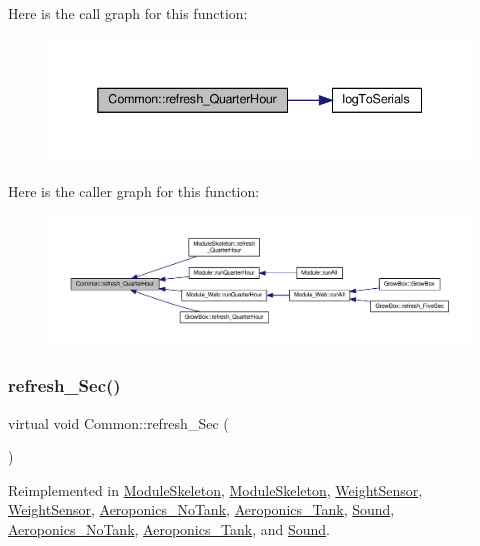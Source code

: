 Here is the call graph for this function\+:
\nopagebreak
\begin{figure}[H]
\begin{center}
\leavevmode
\includegraphics[width=338pt]{class_common_aa7222229739c89d441fadd6a40deff89_cgraph}
\end{center}
\end{figure}
Here is the caller graph for this function\+:
\nopagebreak
\begin{figure}[H]
\begin{center}
\leavevmode
\includegraphics[width=350pt]{class_common_aa7222229739c89d441fadd6a40deff89_icgraph}
\end{center}
\end{figure}
\mbox{\label{class_common_aa7add0429096fbb9059a341e677d7a32}} 
\subsubsection{\texorpdfstring{refresh\+\_\+\+Sec()}{refresh\_Sec()}\hspace{0.1cm}{\footnotesize\ttfamily [1/2]}}
{\footnotesize\ttfamily virtual void Common\+::refresh\+\_\+\+Sec (\begin{DoxyParamCaption}{ }\end{DoxyParamCaption})\hspace{0.3cm}{\ttfamily [virtual]}}



Reimplemented in \hyperlink{class_module_skeleton_ae9b2578a2c1ecb343cd7b3b21320145e}{Module\+Skeleton}, \hyperlink{class_module_skeleton_ae9b2578a2c1ecb343cd7b3b21320145e}{Module\+Skeleton}, \hyperlink{class_weight_sensor_a6f7c6cab318b6677e43b7deb9e0b5fee}{Weight\+Sensor}, \hyperlink{class_weight_sensor_a6f7c6cab318b6677e43b7deb9e0b5fee}{Weight\+Sensor}, \hyperlink{class_aeroponics___no_tank_a8e0130107832f0a60d37ea581f6f67fb}{Aeroponics\+\_\+\+No\+Tank}, \hyperlink{class_aeroponics___tank_a9b1c9377aec2a453e4562bca5ae7afa2}{Aeroponics\+\_\+\+Tank}, \hyperlink{class_sound_a747a131af54af0747775b918aa3f7925}{Sound}, \hyperlink{class_aeroponics___no_tank_a8e0130107832f0a60d37ea581f6f67fb}{Aeroponics\+\_\+\+No\+Tank}, \hyperlink{class_aeroponics___tank_a9b1c9377aec2a453e4562bca5ae7afa2}{Aeroponics\+\_\+\+Tank}, and \hyperlink{class_sound_a747a131af54af0747775b918aa3f7925}{Sound}.

